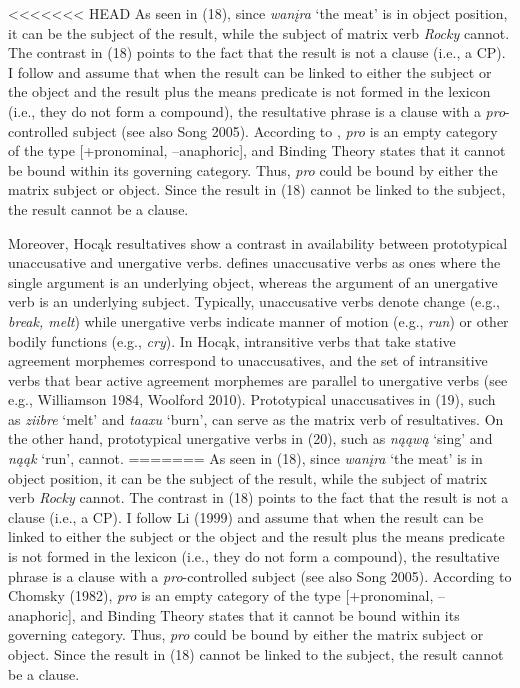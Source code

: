 \documentclass[output=paper]{LSP/langsci}
\begin{document}
\begin{exe}
\begin{exe}
\begin{exe}
\begin{exe}
\end{exe}

<<<<<<< HEAD
As seen in (18), since \textit{wanįra} `the meat' is in object position, it can be the subject of the result, while the subject of matrix verb \textit{Rocky} cannot. The contrast in (18) points to the fact that the result is not a clause (i.e., a CP). I follow \citet{Li1999} and assume that when the result can be linked to either the subject or the object and the result plus the means predicate is not formed in the lexicon (i.e., they do not form a compound), the resultative phrase is a clause with a \textit{pro}-controlled subject (see also Song 2005). According to \citet{Chomsky1982}, \textit{pro} is an empty category of the type [+pronominal, --anaphoric], and Binding Theory states that it cannot be bound within its governing category. Thus, \textit{pro} could be bound by either the matrix subject or object. Since the result in (18) cannot be linked to the subject, the result cannot be a clause.

Moreover, Hocąk resultatives show a contrast in availability between prototypical unaccusative and unergative verbs. \citet{Perlmutter1978} defines unaccusative verbs as ones where the single argument is an underlying object, whereas the argument of an unergative verb is an underlying subject. Typically, unaccusative verbs denote change (e.g., \textit{break, melt}) while unergative verbs indicate manner of motion (e.g., \textit{run}) or other bodily functions (e.g., \textit{cry}). In Hocąk, intransitive verbs that take stative agreement morphemes correspond to unaccusatives, and the set of intransitive verbs that bear active agreement morphemes are parallel to unergative verbs (see e.g., Williamson 1984, Woolford 2010). Prototypical unaccusatives in (19), such as \textit{ziibre} `melt' and \textit{taaxu} `burn', can serve as the matrix verb of resultatives. On the other hand, prototypical unergative verbs in (20), such as \textit{nąąwą} `sing' and \textit{nąąk} `run', cannot.
=======
As seen in (18), since \textit{wan\k{i}ra} `the meat' is in object position, it can be the subject of the result, while the subject of matrix verb \textit{Rocky} cannot. The contrast in (18) points to the fact that the result is not a clause (i.e., a CP). I follow Li (1999) and assume that when the result can be linked to either the subject or the object and the result plus the means predicate is not formed in the lexicon (i.e., they do not form a compound), the resultative phrase is a clause with a \textit{pro}-controlled subject (see also Song 2005). According to Chomsky (1982), \textit{pro} is an empty category of the type [+pronominal, --anaphoric], and Binding Theory states that it cannot be bound within its governing category. Thus, \textit{pro} could be bound by either the matrix subject or object. Since the result in (18) cannot be linked to the subject, the result cannot be a clause.


\end{exe}
\end{exe}
\end{exe}
\end{document}
